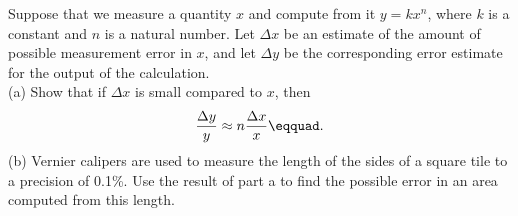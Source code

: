 Suppose that we measure a quantity $x$ and compute from
it $y=kx^n$, where $k$ is a constant and $n$ is a natural
number. Let $\Delta x$ be an estimate of the amount of possible 
measurement error in $x$, and let $\Delta y$ be the corresponding
error estimate for the output of the calculation. \\
(a) Show that
if $\Delta x$ is small compared to $x$, then
\begin{equation*}
  \frac{\Delta y}{y} \approx n \frac{\Delta x}{x}\eqquad.
\end{equation*}
(b) Vernier calipers are used to measure the length of the sides
of a square tile to a precision of 0.1\%.
Use the result of part a to find the possible
error in an area computed from this length.
